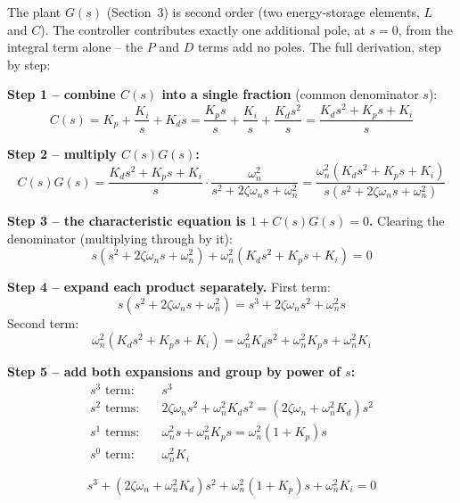 \documentclass[11pt,letterpaper]{article}
\begin{document}
The plant $G(s)$ (Section~3) is second order (two energy-storage elements, $L$ and $C$). The controller
contributes exactly one additional pole, at $s=0$, from the integral term alone -- the $P$ and $D$ terms
add no poles. The full derivation, step by step:

\textbf{Step 1 -- combine $C(s)$ into a single fraction} (common denominator $s$):
\begin{equation}
C(s) = K_p + \frac{K_i}{s} + K_d s = \frac{K_p s}{s} + \frac{K_i}{s} + \frac{K_d s^2}{s} = \frac{K_d s^2 + K_p s + K_i}{s}
\end{equation}

\textbf{Step 2 -- multiply $C(s)G(s)$:}
\begin{equation}
C(s)G(s) = \frac{K_d s^2 + K_p s + K_i}{s}\cdot\frac{\omega_n^2}{s^2+2\zeta\omega_n s+\omega_n^2}
= \frac{\omega_n^2\left(K_d s^2+K_p s+K_i\right)}{s\left(s^2+2\zeta\omega_n s+\omega_n^2\right)}
\end{equation}

\textbf{Step 3 -- the characteristic equation is $1+C(s)G(s)=0$.} Clearing the denominator (multiplying
through by it):
\begin{equation}
s\left(s^2+2\zeta\omega_n s+\omega_n^2\right) + \omega_n^2\left(K_d s^2 + K_p s + K_i\right) = 0
\end{equation}

\textbf{Step 4 -- expand each product separately.} First term:
\begin{equation}
s\left(s^2+2\zeta\omega_n s+\omega_n^2\right) = s^3 + 2\zeta\omega_n s^2 + \omega_n^2 s
\end{equation}
Second term:
\begin{equation}
\omega_n^2\left(K_d s^2+K_p s+K_i\right) = \omega_n^2 K_d s^2 + \omega_n^2 K_p s + \omega_n^2 K_i
\end{equation}

\textbf{Step 5 -- add both expansions and group by power of $s$:}
\begin{align}
s^3 \text{ term:}\quad & s^3 \\
s^2 \text{ terms:}\quad & 2\zeta\omega_n s^2 + \omega_n^2 K_d s^2 = \left(2\zeta\omega_n+\omega_n^2 K_d\right)s^2 \\
s^1 \text{ terms:}\quad & \omega_n^2 s + \omega_n^2 K_p s = \omega_n^2(1+K_p)s \\
s^0 \text{ term:}\quad & \omega_n^2 K_i
\end{align}

\begin{tcolorbox}[colback=blue!5,colframe=blue!40!black,arc=1mm]
\begin{equation}
s^3 + \left(2\zeta\omega_n+\omega_n^2 K_d\right)s^2 + \omega_n^2(1+K_p)s + \omega_n^2 K_i = 0
\end{equation}
\end{tcolorbox}
\end{document}
